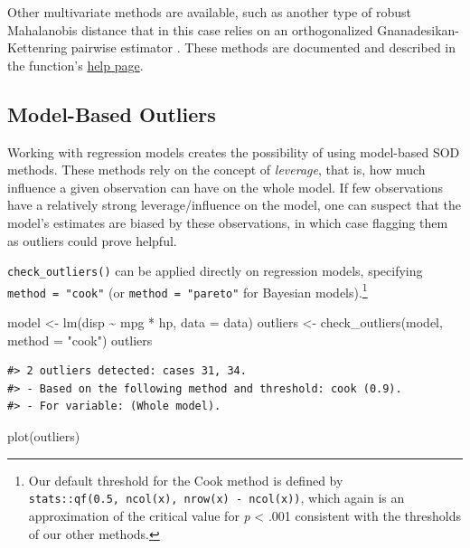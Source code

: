\documentclass[mathematics,article,submit,moreauthors,pdftex]{mdpi}
\newenvironment{Shaded}{\begin{snugshade}}{\end{snugshade}}
\newcommand{\AttributeTok}[1]{\textcolor[rgb]{0.77,0.63,0.00}{#1}}
\newcommand{\FunctionTok}[1]{\textcolor[rgb]{0.00,0.00,0.00}{#1}}
\newcommand{\NormalTok}[1]{#1}
\newcommand{\OtherTok}[1]{\textcolor[rgb]{0.56,0.35,0.01}{#1}}
\newcommand{\SpecialCharTok}[1]{\textcolor[rgb]{0.00,0.00,0.00}{#1}}
\newcommand{\StringTok}[1]{\textcolor[rgb]{0.31,0.60,0.02}{#1}}
\begin{document}
Other multivariate methods are available, such as another type of robust
Mahalanobis distance that in this case relies on an orthogonalized
Gnanadesikan-Kettenring pairwise estimator
\citep{gnanadesikan1972robust}. These methods are documented and
described in the function's
\href{https://easystats.github.io/performance/reference/check_outliers.html}{help
page}.

\hypertarget{model-based-outliers}{%
\subsection{Model-Based Outliers}\label{model-based-outliers}}

Working with regression models creates the possibility of using
model-based SOD methods. These methods rely on the concept of
\emph{leverage}, that is, how much influence a given observation can
have on the whole model. If few observations have a relatively strong
leverage/influence on the model, one can suspect that the model's
estimates are biased by these observations, in which case flagging them
as outliers could prove helpful.

\texttt{check\_outliers()} can be applied directly on regression models,
specifying \texttt{method\ =\ "cook"} (or \texttt{method\ =\ "pareto"}
for Bayesian models).\footnote{Our default threshold for the Cook method
  is defined by \texttt{stats::qf(0.5,\ ncol(x),\ nrow(x)\ -\ ncol(x))},
  which again is an approximation of the critical value for \emph{p}
  \textless{} .001 consistent with the thresholds of our other methods.}

\begin{Shaded}
\begin{Highlighting}[]
\NormalTok{model }\OtherTok{\textless{}{-}} \FunctionTok{lm}\NormalTok{(disp }\SpecialCharTok{\textasciitilde{}}\NormalTok{ mpg }\SpecialCharTok{*}\NormalTok{ hp, }\AttributeTok{data =}\NormalTok{ data)}
\NormalTok{outliers }\OtherTok{\textless{}{-}} \FunctionTok{check\_outliers}\NormalTok{(model, }\AttributeTok{method =} \StringTok{"cook"}\NormalTok{)}
\NormalTok{outliers}
\end{Highlighting}
\end{Shaded}

\begin{verbatim}
#> 2 outliers detected: cases 31, 34.
#> - Based on the following method and threshold: cook (0.9).
#> - For variable: (Whole model).
\end{verbatim}

\begin{Shaded}
\begin{Highlighting}[]
\FunctionTok{plot}\NormalTok{(outliers)}
\end{Highlighting}
\end{Shaded}
\end{document}
